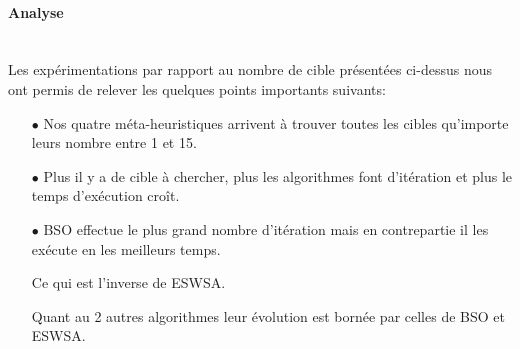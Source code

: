 \noindent
\hspace{-0.5cm}
\begin{minipage}[t]{0.55\textwidth}
	\captionsetup{width=0.8\linewidth}
	\centering{}
	\label{INo}
\end{minipage}\hfill
\begin{minipage}[t]{0.55\textwidth}
	\captionsetup{width=0.8\linewidth}
	\centering{}
	\label{tNo}
\end{minipage}\hfill




\paragraph{Analyse}
\textbf{ }\\
Les expérimentations par rapport au nombre de cible présentées ci-dessus nous ont permis de relever les quelques points importants suivants:
\begin{itemize}
	\item[$\bullet$] Nos quatre méta-heuristiques arrivent à trouver toutes les cibles qu'importe leurs nombre entre 1 et 15.
	\item[$\bullet$] Plus il y a de cible à chercher, plus les algorithmes font d'itération et plus le temps d'exécution croît.
	\item[$\bullet$] BSO effectue le plus grand nombre d'itération mais en contrepartie il les exécute en les meilleurs temps.
	
	Ce qui est l'inverse de ESWSA.
	
	Quant au 2 autres algorithmes leur évolution est bornée par celles de BSO et ESWSA.
\end{itemize}








